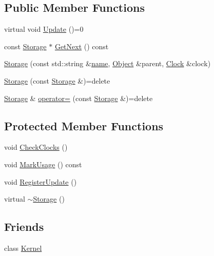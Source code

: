 \subsection*{Public Member Functions}
\begin{DoxyCompactItemize}
\item 
virtual void \hyperlink{class_simulator_1_1_storage_abea2bd330384970436228e1a759b9239}{Update} ()=0
\item 
const \hyperlink{class_simulator_1_1_storage}{Storage} $\ast$ \hyperlink{class_simulator_1_1_storage_a9e3c90321dbde541a0b57163730acb75}{Get\+Next} () const 
\item 
\hyperlink{class_simulator_1_1_storage_a06cb2e92adc46a31b1ff511b218e4465}{Storage} (const std\+::string \&\hyperlink{mtconf_8c_a8f8f80d37794cde9472343e4487ba3eb}{name}, \hyperlink{class_simulator_1_1_object}{Object} \&parent, \hyperlink{class_simulator_1_1_clock}{Clock} \&clock)
\item 
\hyperlink{class_simulator_1_1_storage_ac97357837b77bd9b3cfbdc39caf59b88}{Storage} (const \hyperlink{class_simulator_1_1_storage}{Storage} \&)=delete
\item 
\hyperlink{class_simulator_1_1_storage}{Storage} \& \hyperlink{class_simulator_1_1_storage_a97dbec4dabc2eb3f6d6a943c767cdf18}{operator=} (const \hyperlink{class_simulator_1_1_storage}{Storage} \&)=delete
\end{DoxyCompactItemize}
\subsection*{Protected Member Functions}
\begin{DoxyCompactItemize}
\item 
void \hyperlink{class_simulator_1_1_storage_a52529000e4852dd5ce676557df4586fe}{Check\+Clocks} ()
\item 
void \hyperlink{class_simulator_1_1_storage_a46a6f7a406d12d510c39efb91574d572}{Mark\+Usage} () const 
\item 
void \hyperlink{class_simulator_1_1_storage_aceb798d5199650b16b8f9c4398a4c08a}{Register\+Update} ()
\item 
virtual \hyperlink{class_simulator_1_1_storage_ab8fe2a22c92c8d5a515c81daabdea16a}{$\sim$\+Storage} ()
\end{DoxyCompactItemize}
\subsection*{Friends}
\begin{DoxyCompactItemize}
\item 
class \hyperlink{class_simulator_1_1_storage_a3807a3ebd0e05ca8cb4d928025a943d2}{Kernel}
\end{DoxyCompactItemize}


